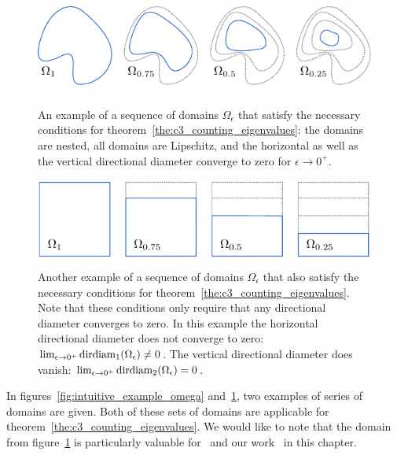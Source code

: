 \begin{figure}[t]
  \begin{center}
    \includegraphics[width=\linewidth]{img/chapter3/counting/main-theorem-omega.pdf}
    \caption{\label{fig:intuitive_example_omega} An example of a sequence of domains $\Omega_\epsilon$ that satisfy the necessary conditions for theorem~\ref{the:c3_counting_eigenvalues}: the domains are nested, all domains are Lipschitz, and the horizontal as well as the vertical directional diameter converge to zero for $\epsilon \to 0^{+}$.}
  \end{center}

  \begin{center}
    \includegraphics[width=\linewidth]{img/chapter3/counting/main-theorem-rho.pdf}
    \caption{\label{fig:intuitive_example_rho} Another example of a sequence of domains $\Omega_\epsilon$ that also satisfy the necessary conditions for theorem~\ref{the:c3_counting_eigenvalues}. Note that these conditions only require that any directional diameter converges to zero. In this example the horizontal directional diameter does not converge to zero: $\lim_{\epsilon \to 0^+}\operatorname{dirdiam}_1(\Omega_\epsilon) \neq 0$. The vertical directional diameter does vanish: $\lim_{\epsilon \to 0^+}\operatorname{dirdiam}_2(\Omega_\epsilon) = 0$.}
  \end{center}
\end{figure}

In figures~\ref{fig:intuitive_example_omega} and~\ref{fig:intuitive_example_rho}, two examples of series of domains are given. Both of these sets of domains are applicable for theorem~\ref{the:c3_counting_eigenvalues}. We would like to note that the domain from figure~\ref{fig:intuitive_example_rho} is particularly valuable for~\cite{ixaru_new_2010} and our work~\cite{baeyens_improvements_2022} in this chapter.

